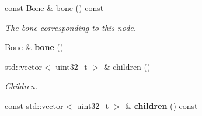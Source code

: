 \begin{Indent}
\begin{DoxyCompactItemize}
\item 
\mbox{\label{classrev_1_1_skeleton_joint_a1e957c2102f799d1643de53d11e1cffd}} 
const \mbox{\hyperlink{classrev_1_1_bone}{Bone}} \& \mbox{\hyperlink{classrev_1_1_skeleton_joint_a1e957c2102f799d1643de53d11e1cffd}{bone}} () const
\begin{DoxyCompactList}\small\item\em The bone corresponding to this node. \end{DoxyCompactList}\item 
\mbox{\label{classrev_1_1_skeleton_joint_a5302cad3faa4c8ab914d7aff98a0ae93}} 
\mbox{\hyperlink{classrev_1_1_bone}{Bone}} \& {\bfseries bone} ()
\item 
\mbox{\label{classrev_1_1_skeleton_joint_aee535c57b7ed1208959f7a7e6b290797}} 
std\+::vector$<$ uint32\+\_\+t $>$ \& \mbox{\hyperlink{classrev_1_1_skeleton_joint_aee535c57b7ed1208959f7a7e6b290797}{children}} ()
\begin{DoxyCompactList}\small\item\em Children. \end{DoxyCompactList}\item 
\mbox{\label{classrev_1_1_skeleton_joint_a3454f8393b306fdb774e93e4fc188974}} 
const std\+::vector$<$ uint32\+\_\+t $>$ \& {\bfseries children} () const
\end{DoxyCompactItemize}
\end{Indent}
